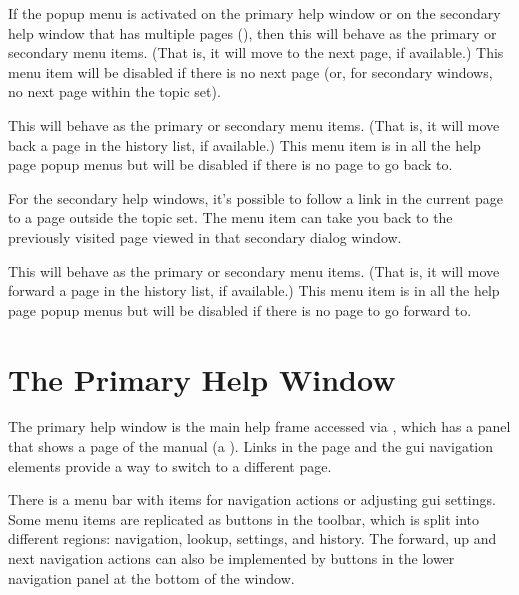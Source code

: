 
If the popup menu is activated on the primary help window or on the
secondary help window that has multiple pages
(), then this will behave
as the primary  or
secondary  menu items.
(That is, it will move to the next page, if available.)
This menu item will be disabled if there is no next page (or, for secondary
windows, no next page within the topic set).


This will behave as the primary
 or secondary
 menu items.
(That is, it will move back a page in the history list, if available.)
This menu item is in all the help page popup menus but will be
disabled if there is no page to go back to.

For the secondary help windows, it's possible to follow a link in
the current page to a page outside the topic set. The menu item can
take you back to the previously visited page viewed in that
secondary dialog window.


This will behave as the primary
 or secondary
 menu items.
(That is, it will move forward a page in the history list, if available.)
This menu item is in all the help page popup menus but will be
disabled if there is no page to go forward to.


\section{The Primary Help Window}
\label{sec:primaryhelp}

The primary help window is the main help frame accessed via
, which has a panel that shows a page of the
manual (a ). Links in the page and the \gls{gui}
navigation elements provide a way to switch to a different page.

There is a menu bar with items for navigation actions or adjusting
\gls{gui} settings. Some menu items are replicated as buttons in the
toolbar, which is split into different regions: navigation, lookup,
settings, and history. The forward, up and next navigation actions
can also be implemented by buttons in the lower navigation panel at
the bottom of the window.

